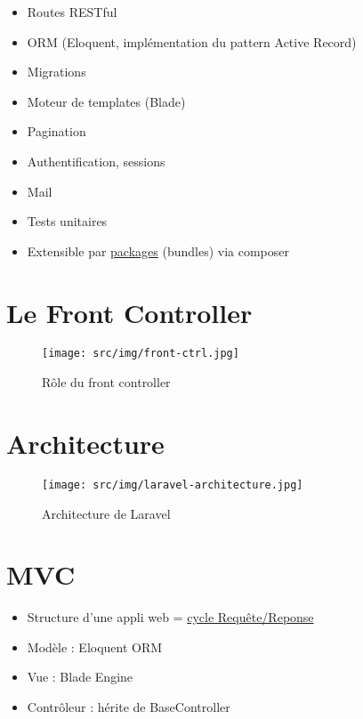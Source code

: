 \begin{itemize}
\tightlist
\item
  Routes RESTful
\item
  ORM (Eloquent, implémentation du pattern Active Record)
\item
  Migrations
\item
  Moteur de templates (Blade)
\item
  Pagination
\item
  Authentification, sessions
\item
  Mail
\item
  Tests unitaires
\item
  Extensible par \href{http://packalyst.com/}{packages} (bundles) via
  composer
\end{itemize}

\hypertarget{le-front-controller}{%
\section{Le Front Controller}\label{le-front-controller}}

\begin{figure}
\centering
\texttt{[image: src/img/front-ctrl.jpg]}
\caption{Rôle du front controller}
\end{figure}

\hypertarget{architecture}{%
\section{Architecture}\label{architecture}}

\begin{figure}
\centering
\texttt{[image: src/img/laravel-architecture.jpg]}
\caption{Architecture de Laravel}
\end{figure}

\hypertarget{mvc}{%
\section{MVC}\label{mvc}}

\begin{itemize}
\tightlist
\item
  Structure d'une appli web =
  \href{https://laravel.com/docs/master/lifecycle}{cycle
  Requête/Reponse}
\item
  Modèle : Eloquent ORM
\item
  Vue : Blade Engine
\item
  Contrôleur : hérite de BaseController
\end{itemize}

